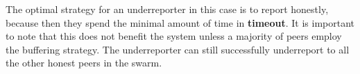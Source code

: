 The optimal strategy for an underreporter in this case is to report honestly, because then they spend the minimal amount of time in \textbf{timeout}. It is important to note that this does not benefit the system unless a majority of peers employ the buffering strategy. The underreporter can still successfully underreport to all the other honest peers in the swarm.
